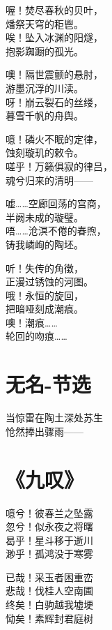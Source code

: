 喔！焚尽春秋的贝叶， \\
燔祭天穹的秬鬯。 \\
唉！坠入冰渊的阳燧， \\
抱影踟蹰的孤光。
\vspace{1em}

噢！隔世震颤的悬肘， \\
游墨沉浮的川渎。 \\
呀！崩云裂石的丝缕， \\
暮雪千帆的舟舆。
\vspace{1em}

噫！磷火不眠的定律， \\
蚀刻璇玑的敕令。 \\
嗟乎！万籁俱寂的律吕， \\
魂兮归来的清明——
\vspace{1em}

嘘……空廊回荡的宫商， \\
半阙未成的璇璧。 \\
唔……沧溟不倦的春煦， \\
铸我嶙峋的陶坯。
\vspace{1em}

听！失传的角徵， \\
正漫过锈蚀的河图。 \\
哦！永恒的旋回， \\
把暗哑刻成潮痕。 \\
噢！潮痕…… \\
轮回的吻痕……

\clearpage


\section{无名-节选}

当惊雷在陶土深处苏生 \\
怆然捧出骤雨——

\clearpage


\section{《九叹》}

噫兮！彼春兰之坠露 \\
忽兮！似永夜之将曙 \\
曷乎！星斗移于逝川 \\
渺乎！孤鸿没于寒雾
\vspace{1em}

已哉！采玉者困重峦 \\
悲哉！伐桂人空南圃 \\
终矣！白驹越我墟埂 \\
恸矣！素辉封君庭树

